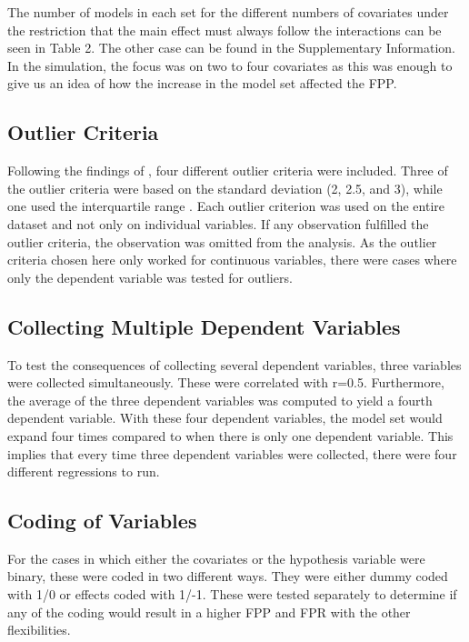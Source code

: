 The number of models in each set for the different numbers of covariates under the restriction that the main effect must always follow the interactions can be seen in Table 2. The other case can be found in the Supplementary Information. \\



In the simulation, the focus was on two to four covariates as this was enough to give us an idea of how the increase in the model set affected the FPP. 

\subsection{Outlier Criteria}
Following the findings of \cite{Leyes2013}, four different outlier criteria were included. Three of the outlier criteria were based on the standard deviation (2, 2.5, and 3), while one used the interquartile range \citep{Rousseeuw2011}. Each outlier criterion was used on the entire dataset and not only on individual variables. If any observation fulfilled the outlier criteria, the observation was omitted from the analysis. As the outlier criteria chosen here only worked for continuous variables, there were cases where only the dependent variable was tested for outliers.

\subsection{Collecting Multiple Dependent Variables}
To test the consequences of collecting several dependent variables, three variables were collected simultaneously. These were correlated with r=0.5. Furthermore, the average of the three dependent variables was computed to yield a fourth dependent variable. With these four dependent variables, the model set would expand four times compared to when there is only one dependent variable. This implies that every time three dependent variables were collected, there were four different regressions to run.

\subsection{Coding of Variables}
For the cases in which either the covariates or the hypothesis variable were binary, these were coded in two different ways. They were either dummy coded with 1/0 or effects coded with 1/-1. These were tested separately to determine if any of the coding would result in a higher FPP and FPR with the other flexibilities.

